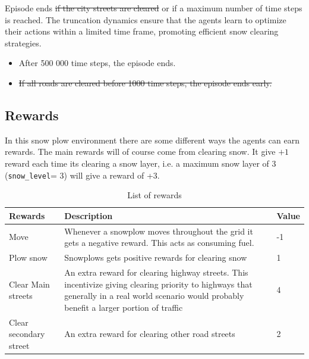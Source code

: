 \documentclass{scrartcl}
\theoremstyle{mytheoremstyle}
\theoremstyle{mytheoremstyle}
\theoremstyle{myproblemstyle}
\begin{document}
Episode ends \st{if the city streets are cleared} or if a maximum number of time steps is reached. The truncation dynamics ensure that the agents learn to optimize their actions within a limited time frame, promoting efficient snow clearing strategies.

\begin{itemize}
    \item After 500 000 time steps, the episode ends.
    \item \st{If all roads are cleared before 1000 time steps, the episode ends early.}
\end{itemize}

\newpage

\subsection{Rewards}

In this snow plow environment there are some different ways the agents can earn rewards. The main rewards will of course come from clearing snow. It give $+1$ reward each time its clearing a snow layer, i.e. a maximum snow layer of 3 (\texttt{snow\_level}= 3) will give a reward of +3.

\begin{table}[ht]
    \centering
    \begin{tabularx}{\textwidth}{|Y|M{0.6\textwidth}|Y|}
        \hline
        \textbf{Rewards}
                               &
        \textbf{Description}
                               &
        \textbf{Value}
        \\\hline
        Move
                               &
        Whenever a snowplow moves throughout the grid it gets a negative reward. This acts as consuming fuel.
                               &
        -1
        \\\hline
        Plow snow              &
        Snowplows gets positive rewards for clearing snow
                               &
        1
        \\\hline
        Clear Main streets     &
        An extra reward for clearing highway streets. This incentivize giving clearing priority to highways that generally in a real world scenario would probably benefit a larger portion of traffic
                               &
        4
        \\\hline
        Clear secondary street &
        An extra reward for clearing other road streets
                               &
        2
        \\\hline
    \end{tabularx}
    \caption{List of rewards}
    \label{tab:rewards}
\end{table}
\end{document}
